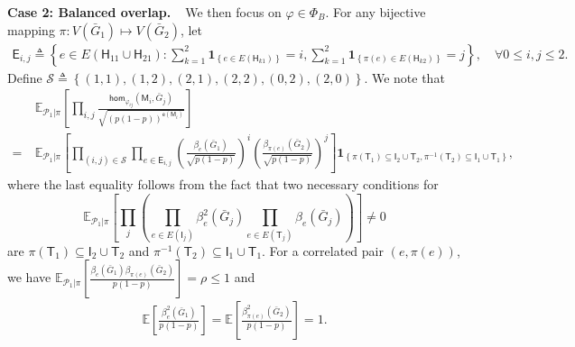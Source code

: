 \documentclass[letterpaper,11pt]{article}
\theoremstyle{definition}
\newcommand{\maP}{\mathcal{P}}
\newcommand{\maS}{\mathcal{S}}
\newcommand{\en}{\mathsf{{e}}}
\newcommand{\vn}{\mathsf{{v}}}
\newcommand{\pth}[1]{\left( #1 \right)}
\newcommand{\qth}[1]{\left[ #1 \right]}
\newcommand{\sth}[1]{\left\{ #1 \right\}}
\newcommand{\sfE}{{\mathsf{E}}}
\newcommand{\sfH}{{\mathsf{H}}}
\newcommand{\sfI}{{\mathsf{I}}}
\newcommand{\sfM}{{\mathsf{M}}}
\newcommand{\sfT}{{\mathsf{T}}}
\newcommand{\indc}[1]{{\mathbf{1}_{\left\{{#1}\right\}}}}
\renewcommand{\hom}{\mathsf{hom}}
\newcommand{\vp}{\varphi}
\def\E{\mathbb{E}}
\begin{document}
\textbf{Case 2: Balanced overlap.\ \ }We then focus on $\vp \in \Phi_B$. %
For any bijective mapping $\pi:V(\bar{G}_1)\mapsto V(\bar{G}_2)$, let 
\begin{align*}
    \sfE_{i,j}\triangleq\sth{e\in E(\sfH_{11}\cup \sfH_{21}):\sum_{k=1}^2 \indc{e\in E(\sfH_{k1})} = i,\sum_{k=1}^2\indc{\pi(e)\in E(\sfH_{k2})} = j },\quad \forall 0\le i,j\le 2.
\end{align*}
Define $\maS\triangleq \sth{(1,1),(1,2),(2,1),(2,2),(0,2),(2,0)}$. We note that \begin{align}
    \nonumber &~\E_{\maP_1|\pi}\qth{\prod_{i,j}\frac{\hom_{\vp_{ij}}(\sfM_i,\bar{G}_j)}{\sqrt{(p(1-p))^{\en(\sfM_i)}}}}   \\\label{eq:upbd-vp1-4-moment}
    =&~\E_{\maP_1|\pi}\qth{\prod_{(i,j)\in \maS}\prod_{e\in \sfE_{i,j}} \pth{\frac{\beta_e(\bar{G}_1)}{\sqrt{p(1-p)}}}^i\pth{\frac{\beta_{\pi(e)}(\bar{G}_2)}{\sqrt{p(1-p)}}}^{j}} \indc{\pi(\sfT_1)\subseteq \sfI_2\cup \sfT_2,\pi^{-1}(\sfT_2)\subseteq \sfI_1\cup \sfT_1}, 
\end{align}
where the last equality follows from the fact that two necessary conditions for $$\E_{\maP_1|\pi}\qth{\prod_{j}\pth{\prod_{e\in E(\sfI_j)} \beta_e^2(\bar{G}_j) \prod_{e\in E(\sfT_j)} \beta_e(\bar{G}_j)} }\neq 0$$ are $\pi(\sfT_1)\subseteq \sfI_2\cup \sfT_2$ and $\pi^{-1}(\sfT_2)\subseteq \sfI_1\cup \sfT_1$.
For a correlated pair $(e,\pi(e))$, we have $\E_{\maP_1|\pi} \qth{\frac{\beta_{e}(\bar{G}_1)\beta_{\pi(e)}(\bar{G}_2)}{p(1-p)}} = \rho\le 1$ and \begin{align*}
    \E\qth{\frac{\beta_e^2(\bar{G}_1)}{p(1-p)}} = \E\qth{\frac{\beta_{\pi(e)}^2(\bar{G}_2)}{p(1-p)}}=1.
\end{align*}
\end{document}
